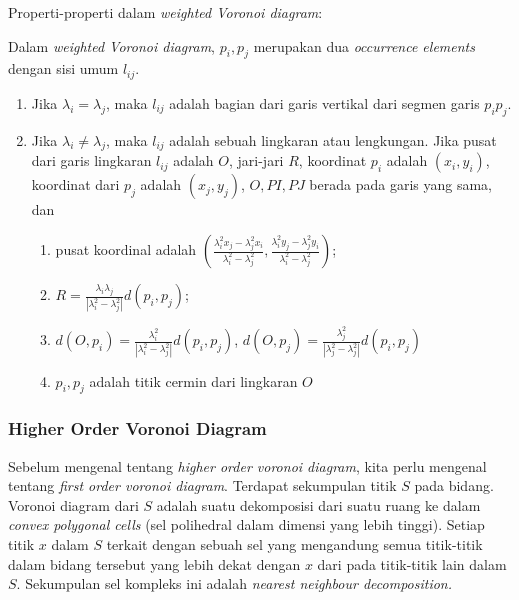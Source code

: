 Properti-properti dalam \textit{weighted Voronoi diagram}:

Dalam \textit{weighted Voronoi diagram}, $p_{i}, p_{j}$ merupakan dua \textit{occurrence elements} dengan sisi umum $l_{ij}$.

\begin{enumerate}
	\item Jika $\lambda_{i} = \lambda_{j}$, maka $l_{ij}$ adalah bagian dari garis vertikal dari segmen garis $p_{i}p_{j}$.
	\item Jika $\lambda_{i} \neq \lambda_{j}$, maka $l_{ij}$ adalah sebuah lingkaran atau lengkungan. Jika pusat dari garis lingkaran $l_{ij}$ adalah $O$, jari-jari $R$, koordinat $p_{i}$ adalah $\left(x_{i},y_{i}\right)$, koordinat dari $p_{j}$ adalah $\left(x_{j},y_{j}\right)$, $O, PI, PJ$ berada pada garis yang sama, dan
	\begin{enumerate}
		\item pusat koordinal adalah $\left(\frac{\lambda_{i}^{2} x_{j} - \lambda_{j}^{2} x_{i}}{\lambda_{i}^{2} - \lambda_{j}^{2}}, \frac{\lambda_{i}^{2} y_{j} - \lambda_{j}^{2} y_{i}}{\lambda_{i}^{2} - \lambda_{j}^{2}} \right)$;
		\item $R = \frac{\lambda_{i} \lambda_{j}}{| \lambda_{i}^{2} - \lambda_{j}^{2} |} d\left(p_{i},p_{j} \right)$;
		\item $d\left(O,p_{i} \right) = \frac{\lambda_{i}^{2}}{| \lambda_{i}^{2} - \lambda_{j}^{2} |} d\left(p_{i}, p_{j}\right)$, $d\left(O,p_{j} \right) = \frac{\lambda_{j}^{2}}{| \lambda_{j}^{2} - \lambda_{j}^{2} |} d\left(p_{i}, p_{j}\right)$
		\item $p_{i}, p_{j}$ adalah titik cermin dari lingkaran $O$
	\end{enumerate}
\end{enumerate} \cite{substation}

\subsubsection{Higher Order Voronoi Diagram}

Sebelum mengenal tentang \textit{higher order voronoi diagram}, kita perlu mengenal tentang \textit{first order voronoi diagram}. Terdapat sekumpulan titik $S$ pada bidang. Voronoi diagram dari $S$ adalah suatu dekomposisi dari suatu ruang ke dalam \textit{convex polygonal cells} (sel polihedral dalam dimensi yang lebih tinggi). Setiap titik $x$ dalam $S$ terkait dengan sebuah sel yang mengandung semua titik-titik dalam bidang tersebut yang lebih dekat dengan $x$ dari pada titik-titik lain dalam $S$. Sekumpulan sel kompleks ini adalah \textit{nearest neighbour decomposition.} \cite{hovd} 

